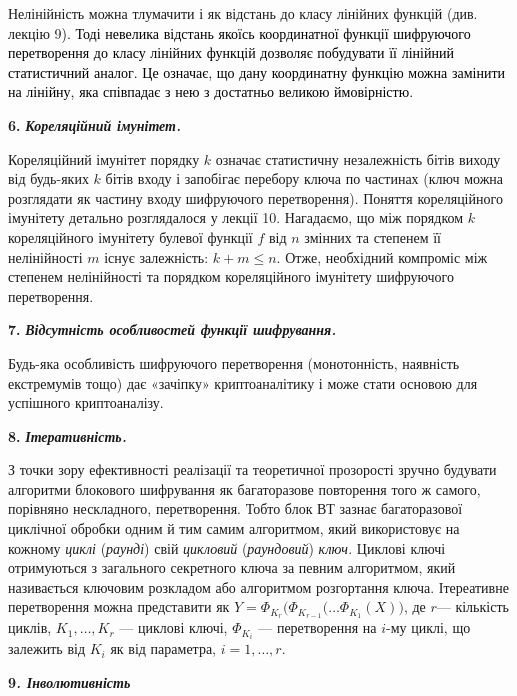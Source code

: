 Нелінійність можна тлумачити і як відстань до класу лінійних функцій (див.
лекцію 9\textcolor{black}{). Тоді невелика відстань якоїсь координатної функції
шифруючого перетворення до класу лінійних функцій дозволяє побудувати її
лінійний статистичний аналог. Це означає, що дану координатну функцію можна
замінити на лінійну, яка співпадає з нею з достатньо великою ймовірністю.}

\textbf{6.}\textit{  }\textbf{\textit{ Кореляційний імунітет.}}

Кореляційний імунітет порядку  $k$ означає статистичну незалежність бітів
виходу від будь-яких  $k$ бітів входу і запобігає перебору ключа по частинах
(ключ можна розглядати як частину входу шифруючого перетворення). Поняття
кореляційного імунітету детально розглядалося у лекції 10. Нагадаємо, що між
порядком  $k$ кореляційного імунітету булевої функції  $f$ від  $n$
змінних та степенем її нелінійності  $m$ існує залежність:  $k+m\le n$.
Отже,  необхідний компроміс між степенем нелінійності та порядком кореляційного
імунітету шифруючого перетворення.


\bigskip

\textbf{7.}\textit{  }\textbf{\textit{Відсутність особливостей функції
шифрування.}}

Будь-яка особливість шифруючого перетворення (монотонність, наявність
екстремумів тощо) дає «зачіпку» криптоаналітику і може стати основою для
успішного криптоаналізу.


\bigskip

\textbf{8.}\textit{ }\textbf{\textit{ Ітеративність.}}

З точки зору ефективності реалізації та теоретичної прозорості зручно будувати
алгоритми блокового шифрування як багаторазове повторення того ж самого,
порівняно нескладного, перетворення. Тобто блок ВТ зазнає багаторазової
циклічної обробки одним й тим самим алгоритмом, який використовує на кожному
\textit{циклі} (\textit{раунді}) свій \textit{цикловий }(\textit{раундовий})
\textit{ключ.} Циклові ключі отримуються з загального секретного ключа за
певним алгоритмом, який називається ключовим розкладом або алгоритмом
розгортання ключа. Ітереативне перетворення можна представити як   ${Y=\Phi
_{K_{{r}}}(\Phi _{K_{r-1}}{(\dots\Phi
_{K_{1}}}{(X))}}$, де  $r$--- кількість циклів, 
$K_{1},\dots,K_r$ --- циклові ключі,  ${\Phi
_{K_{{i}}}}$ $ $--- перетворення на  $i${}-му циклі,  що залежить від 
$K_i$ як від параметра,  $i=1,\dots,r$.


\bigskip

{\bfseries
9\textit{.  Інволютивність }}

